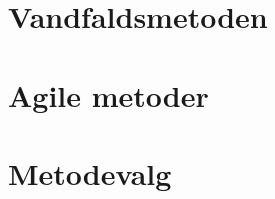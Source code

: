\section{Vandfaldsmetoden}\label{sec:vandfald}

\section{Agile metoder}\label{sec:agilemetoder}

\section{Metodevalg}\label{sec:valgafprocesmodel}